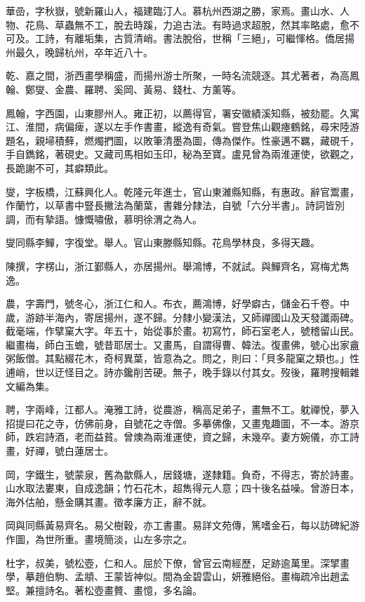 \begin{pinyinscope}
華嵒，字秋嶽，號新羅山人，福建臨汀人。慕杭州西湖之勝，家焉。畫山水、人物、花鳥、草蟲無不工，脫去時蹊，力追古法。有時過求超脫，然其率略處，愈不可及。工詩，有離垢集，古質清峭。書法脫俗，世稱「三絕」，可繼惲格。僑居揚州最久，晚歸杭州，卒年近八十。

乾、嘉之間，浙西畫學稱盛，而揚州游士所聚，一時名流競逐。其尤著者，為高鳳翰、鄭燮、金農、羅聘、奚岡、黃易、錢杜、方薰等。

鳳翰，字西園，山東膠州人。雍正初，以薦得官，署安徽績溪知縣，被劾罷。久寓江、淮間，病偏痺，遂以左手作書畫，縱逸有奇氣。嘗登焦山觀瘞鶴銘，尋宋陸游題名，親埽積蘚，燃燭捫圖，以敗筆清墨為圖，傳為傑作。性豪邁不羈，藏硯千，手自鐫銘，著硯史。又藏司馬相如玉印，秘為至寶。盧見曾為兩淮運使，欲觀之，長跪謝不可，其癖類此。

燮，字板橋，江蘇興化人。乾隆元年進士，官山東濰縣知縣，有惠政。辭官鬻畫，作蘭竹，以草書中豎長撇法為蘭葉，書雜分隸法，自號「六分半書」。詩詞皆別調，而有摯語。慷慨嘯傲，慕明徐渭之為人。

燮同縣李鱓，字復堂。舉人。官山東滕縣知縣。花鳥學林良，多得天趣。

陳撰，字楞山，浙江鄞縣人，亦居揚州。舉鴻博，不就試。與鱓齊名，寫梅尤雋逸。

農，字壽門，號冬心，浙江仁和人。布衣，薦鴻博，好學癖古，儲金石千卷。中歲，游跡半海內，寄居揚州，遂不歸。分隸小變漢法，又師禪國山及天發讖兩碑。截毫端，作擘窠大字。年五十，始從事於畫。初寫竹，師石室老人，號稽留山民。繼畫梅，師白玉蟾，號昔耶居士。又畫馬，自謂得曹、韓法。復畫佛，號心出家盦粥飯僧。其點綴花木，奇柯異葉，皆意為之。問之，則曰：「貝多龍窠之類也。」性逋峭，世以迂怪目之。詩亦鑱削苦硬。無子，晚手錄以付其女。歿後，羅聘搜輯雜文編為集。

聘，字兩峰，江都人。淹雅工詩，從農游，稱高足弟子，畫無不工。躭禪悅，夢入招提曰花之寺，仿佛前身，自號花之寺僧。多摹佛像，又畫鬼趣圖，不一本。游京師，跌宕詩酒，老而益貧。曾燠為兩淮運使，資之歸，未幾卒。妻方婉儀，亦工詩畫，好禪，號白蓮居士。

岡，字鐵生，號蒙泉，舊為歙縣人，居錢塘，遂隸籍。負奇，不得志，寄於詩畫。山水取法婁東，自成逸韻；竹石花木，超雋得元人意；四十後名益噪。曾游日本，海外估舶，懸金購其畫。徵孝廉方正，辭不就。

岡與同縣黃易齊名。易父樹穀，亦工書畫。易詳文苑傳，篤嗜金石，每以訪碑紀游作圖，為世所重。畫境簡淡，山左多宗之。

杜字，叔美，號松壺，仁和人。屈於下僚，曾官云南經歷，足跡逾萬里。深揅畫學，摹趙伯駒、孟頫、王蒙皆神似。間為金碧雲山，妍雅絕俗。畫梅疏冷出趙孟堅。兼擅詩名。著松壺畫贅、畫憶，多名論。


\end{pinyinscope}
